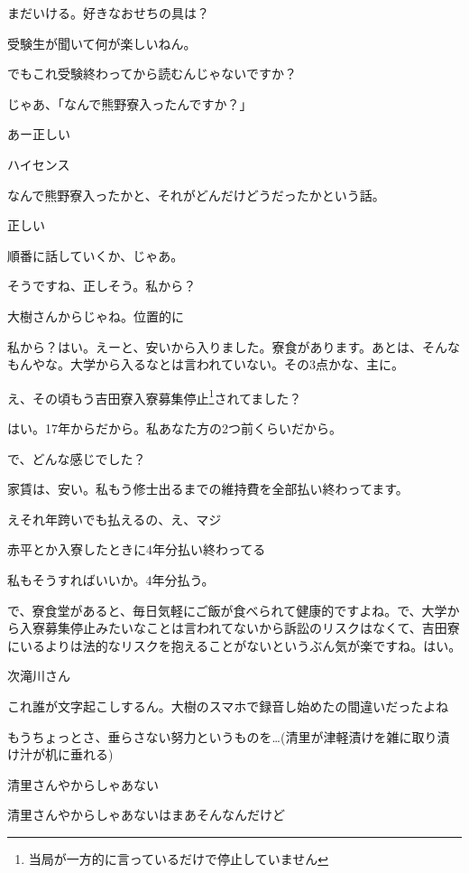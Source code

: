 \begin{multicols}{3}
まだいける。好きなおせちの具は？

受験生が聞いて何が楽しいねん。

でもこれ受験終わってから読むんじゃないですか？

じゃあ、「なんで熊野寮入ったんですか？」

あー正しい

ハイセンス

なんで熊野寮入ったかと、それがどんだけどうだったかという話。

正しい

順番に話していくか、じゃあ。

そうですね、正しそう。私から？

大樹さんからじゃね。位置的に

私から？はい。えーと、安いから入りました。寮食があります。あとは、そんなもんやな。大学から入るなとは言われていない。その3点かな、主に。

え、その頃もう吉田寮入寮募集停止\footnote{当局が一方的に言っているだけで停止していません}されてました？

はい。17年からだから。私あなた方の2つ前くらいだから。

で、どんな感じでした？

家賃は、安い。私もう修士出るまでの維持費を全部払い終わってます。

えそれ年跨いでも払えるの、え、マジ

赤平とか入寮したときに4年分払い終わってる

私もそうすればいいか。4年分払う。

で、寮食堂があると、毎日気軽にご飯が食べられて健康的ですよね。で、大学から入寮募集停止みたいなことは言われてないから訴訟のリスクはなくて、吉田寮にいるよりは法的なリスクを抱えることがないというぶん気が楽ですね。はい。

次滝川さん

これ誰が文字起こしするん。大樹のスマホで録音し始めたの間違いだったよね

もうちょっとさ、垂らさない努力というものを…(清里が津軽漬けを雑に取り漬け汁が机に垂れる)

清里さんやからしゃあない

清里さんやからしゃあないはまあそんなんだけど


\end{multicols}
